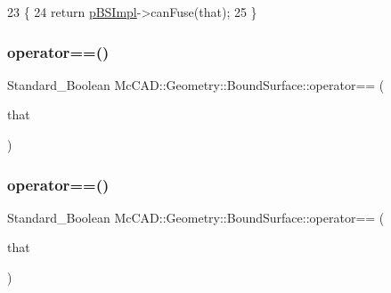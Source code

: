 \begin{DoxyCode}
23                                                                             \{
24   \textcolor{keywordflow}{return} \hyperlink{classMcCAD_1_1Geometry_1_1BoundSurface_ae678fabb46e22b7a68a336051b366ddf}{pBSImpl}->canFuse(that);
25 \}
\end{DoxyCode}
\mbox{\label{classMcCAD_1_1Geometry_1_1BoundSurface_a5c7eafa600bd89b55fa06ddb9b21cc08}} 
\subsubsection{\texorpdfstring{operator==()}{operator==()}\hspace{0.1cm}{\footnotesize\ttfamily [1/2]}}
{\footnotesize\ttfamily Standard\+\_\+\+Boolean Mc\+C\+A\+D\+::\+Geometry\+::\+Bound\+Surface\+::operator== (\begin{DoxyParamCaption}\item[{const \hyperlink{classMcCAD_1_1Geometry_1_1BoundSurface}{Bound\+Surface} \&}]{that }\end{DoxyParamCaption})\hspace{0.3cm}{\ttfamily [inherited]}}

\mbox{\label{classMcCAD_1_1Geometry_1_1BoundSurface_a5c7eafa600bd89b55fa06ddb9b21cc08}} 
\subsubsection{\texorpdfstring{operator==()}{operator==()}\hspace{0.1cm}{\footnotesize\ttfamily [2/2]}}
{\footnotesize\ttfamily Standard\+\_\+\+Boolean Mc\+C\+A\+D\+::\+Geometry\+::\+Bound\+Surface\+::operator== (\begin{DoxyParamCaption}\item[{const \hyperlink{classMcCAD_1_1Geometry_1_1BoundSurface}{Bound\+Surface} \&}]{that }\end{DoxyParamCaption})\hspace{0.3cm}{\ttfamily [inherited]}}



